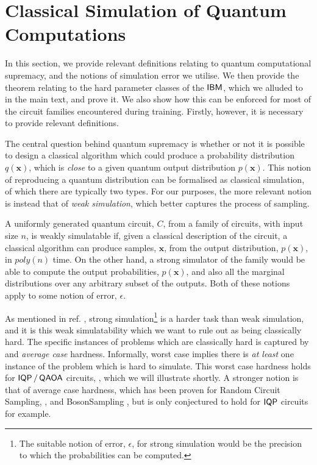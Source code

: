 

\section{Classical Simulation of Quantum Computations}
\label{supp_matt:hardness}

In this section, we provide relevant definitions relating to quantum computational supremacy, and the notions of simulation error we utilise. We then provide the theorem relating to the hard parameter classes of the $\textsf{IBM}$, which we alluded to in the main text, and prove it. We also show how this can be enforced for most of the circuit families encountered during training. Firstly, however, it is necessary to provide relevant definitions.

The central question behind quantum supremacy is whether or not it is possible to design a classical algorithm which could produce a probability distribution $q(\mathbf{x})$, which is \textit{close} to a given quantum output distribution $p(\mathbf{x})$. This notion of reproducing a quantum distribution can be formalised as classical simulation, of which there are typically two types. 
For our purposes, the more relevant notion is instead that of \textit{weak simulation}, which better captures the process of sampling.
\begin{definition}  \label{defn:strong_weak_sim}
    A uniformly generated quantum circuit, $C$, from a family of  circuits, with input size $n$, is weakly simulatable if, given a classical description of the circuit, a classical algorithm can produce samples, $\mathbf{x}$, from the output distribution, $p(\mathbf{x})$, in $poly(n)$ time. On the other hand, a strong simulator of the family would be able to compute the output probabilities, $p(\mathbf{x})$, and also all the marginal distributions over any arbitrary subset of the outputs. Both of these notions apply to some notion of error, $\epsilon$.
\end{definition}

As mentioned in ref. , strong simulation\footnote{The suitable notion of error, $\epsilon$, for strong simulation would be the precision to which the probabilities can be computed.} is a harder task than weak simulation, and it is this weak simulatability which we want to rule out as being classically hard. The specific instances of problems which are classically hard is captured by  and \textit{average case} hardness. Informally, worst case implies there is \textit{at least} one instance of the problem which is hard to simulate. This worst case hardness holds for $\operatorname{\textsf{IQP}}/\operatorname{\textsf{QAOA}}$ circuits, , which we will illustrate shortly. A stronger notion is that of average case hardness, which has been proven for Random Circuit Sampling, , and \textsf{BosonSampling} , but is only conjectured to hold for $\operatorname{\textsf{IQP}}$ circuits for example.

